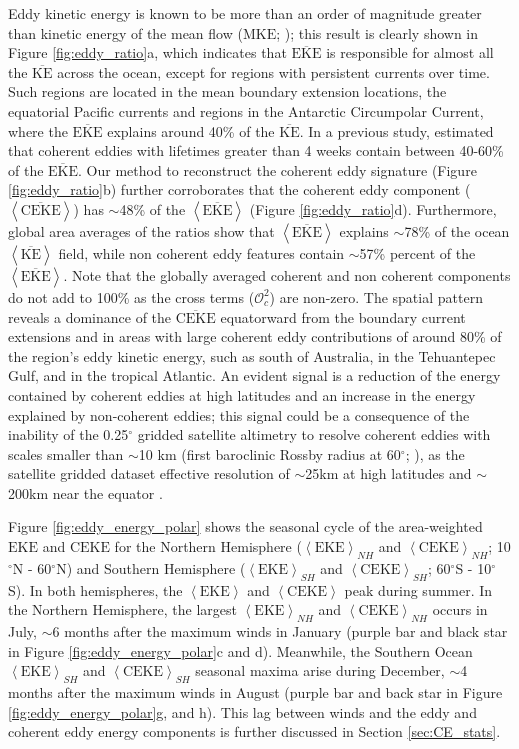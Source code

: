 \documentclass[draft,linenumbers]{agujournal2019}
\newcommand{\MKE}{\overline{\textrm{KE}}}
\newcommand{\mKE}{\textrm{MKE}}
\newcommand{\MEKE}{\overline{\textrm{EKE}}}
\newcommand{\EKE}{\textrm{EKE}}
\newcommand{\MCEKE}{\overline{\textrm{CEKE}}}
\newcommand{\CEKE}{\textrm{CEKE}}
\begin{document}
	Eddy kinetic energy is known to be more than an order of magnitude greater than kinetic energy of the mean flow ($\mKE$; \citealp{Gill_Energy_1974}); this result is clearly shown in Figure \ref{fig:eddy_ratio}a, which indicates that $\MEKE$ is responsible for almost all the $\MKE$ across the ocean, except for regions with persistent currents over time. 
	Such regions are located in the mean boundary extension locations, the equatorial Pacific currents and regions in the Antarctic Circumpolar Current, where the $\MEKE$ explains around 40\% of the $\MKE$. 
	In a previous study, \citet{Chelton_The_2011} estimated that coherent eddies with lifetimes greater than 4 weeks contain between 40-60\% of the $\MEKE$. 
	Our method to reconstruct the coherent eddy signature (Figure \ref{fig:eddy_ratio}b) further corroborates that the coherent eddy component ($\left<\MCEKE\right>$) has $\sim$48\% of the $\left<\MEKE\right>$ (Figure \ref{fig:eddy_ratio}d). 
	Furthermore, global area averages of the ratios show that $\left<\MEKE\right>$ explains $\sim$78\% of the ocean $\left<\MKE\right>$ field, while non coherent eddy features contain $\sim$57\% percent of the $\left<\MEKE\right>$. 
	Note that the globally averaged coherent and non coherent components do not add to 100\% as the cross terms ($\mathcal{O}_c^2$) are non-zero.
	The spatial pattern reveals a dominance of the $\MCEKE$ equatorward from the boundary current extensions and in areas with large coherent eddy contributions of around 80\% of the region's eddy kinetic energy, such as south of Australia, in the Tehuantepec Gulf, and in the tropical Atlantic. 
	An evident signal is a reduction of the energy contained by coherent eddies at high latitudes and an increase in the energy explained by non-coherent eddies; this signal could be a consequence of the inability of the 0.25$^\circ$ gridded satellite altimetry to resolve coherent eddies with scales smaller than $\sim$10 km (first baroclinic Rossby radius at 60$^\circ$; \citealp{Chelton_Geographical_1998}), as the satellite gridded dataset effective resolution of $\sim$25km at high latitudes and $\sim$200km near the equator \citep{Ballarotta_resolutions_2019}.

	Figure \ref{fig:eddy_energy_polar} shows the seasonal cycle of the area-weighted $\EKE$ and $\CEKE$ for the Northern Hemisphere ($\left< \EKE\right>_{NH}$ and $\left< \CEKE\right>_{NH}$; 10$^\circ$N - 60$^\circ$N) and Southern Hemisphere ($\left< \EKE\right>_{SH}$  and $\left< \CEKE\right>_{SH}$; 60$^\circ$S - 10$^\circ$S). 
	In both hemispheres, the $\left<\EKE\right>$ and $\left<\CEKE\right>$ peak during summer. In the Northern Hemisphere, the largest $\left<\EKE\right>_{NH}$ and $\left<\CEKE\right>_{NH}$ occurs in July, $\sim$6 months after the maximum winds in January (purple bar and black star in Figure \ref{fig:eddy_energy_polar}c and d). Meanwhile, the Southern Ocean 
	$\left<\EKE\right>_{SH}$ and $\left<\CEKE\right>_{SH}$ seasonal maxima arise during December, $\sim$4 months after the maximum winds in August (purple bar and back star in Figure \ref{fig:eddy_energy_polar}g, and h). This lag between winds and the eddy and coherent eddy energy components is further discussed in Section \ref{sec:CE_stats}.
\end{document}
